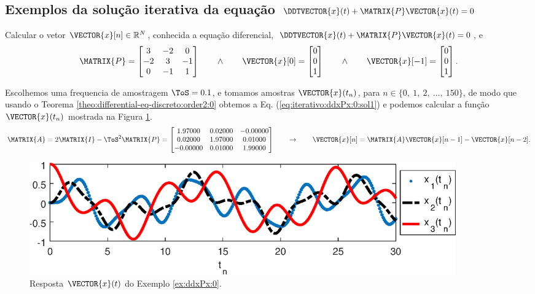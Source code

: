\subsection{Exemplos da solução iterativa da equação $\DDTVECTOR{x}(t) + \MATRIX{P} \VECTOR{x}(t)=0$}

\begin{example}
\label{ex:iterativo:ddxPx:0}
Calcular o vetor $\VECTOR{x}[n] \in \mathbb{R}^{N}$,
conhecida a equação diferencial, $\DDTVECTOR{x}(t) + \MATRIX{P} \VECTOR{x}(t)=0$, e
\begin{equation}
\MATRIX{P}=
\begin{bmatrix}
3 & -2 & 0\\
-2 & 3 & -1\\
0 & -1 & 1
\end{bmatrix}
\qquad \wedge \qquad
\VECTOR{x}[0]=
\begin{bmatrix}
0\\
0\\
1
\end{bmatrix}
\qquad \wedge \qquad
\VECTOR{x}[-1]=
\begin{bmatrix}
0\\
0\\
1
\end{bmatrix}.
\end{equation}
\end{example}


\begin{SolutionT}
\label{ex:iterativo:ddxPx:0:sol1}
Escolhemos uma frequencia de amostragem $\ToS=0.1$, e
tomamos amostras $\VECTOR{x}(t_n)$, para $n \in \{0,~ 1,~ 2,~ ...,~ 150\}$, 
de modo que usando o Teorema \ref{theo:differential-eq-discreto:order2:0} obtemos a Eq. (\ref{eq:iterativo:ddxPx:0:sol1})
e podemos calcular a função $\VECTOR{x}(t_n)$ mostrada na Figura \ref{fig:ex:iterativo:ddxPx:0}.
\begin{equation}\label{eq:iterativo:ddxPx:0:sol1}
\MATRIX{A}=
2\MATRIX{I} -\ToS^2 \MATRIX{P}=
\begin{bmatrix}
   1.97000 & 0.02000 &-0.00000\\
   0.02000 & 1.97000 & 0.01000\\
  -0.00000 & 0.01000 & 1.99000
\end{bmatrix}
\qquad \rightarrow \qquad
\VECTOR{x}[n]=\MATRIX{A} \VECTOR{x}[n-1]-\VECTOR{x}[n-2].
\end{equation}
\end{SolutionT}

     \begin{figure}[!h]
         \centering
         \includegraphics[width=0.89\textwidth]{chapters/differential-eq-discreto/mfiles/segundoorder/segundooder1.eps}
         \caption{Resposta $\VECTOR{x}(t)$ do Exemplo \ref{ex:ddxPx:0}.}
         \label{fig:ex:iterativo:ddxPx:0}
     \end{figure}
